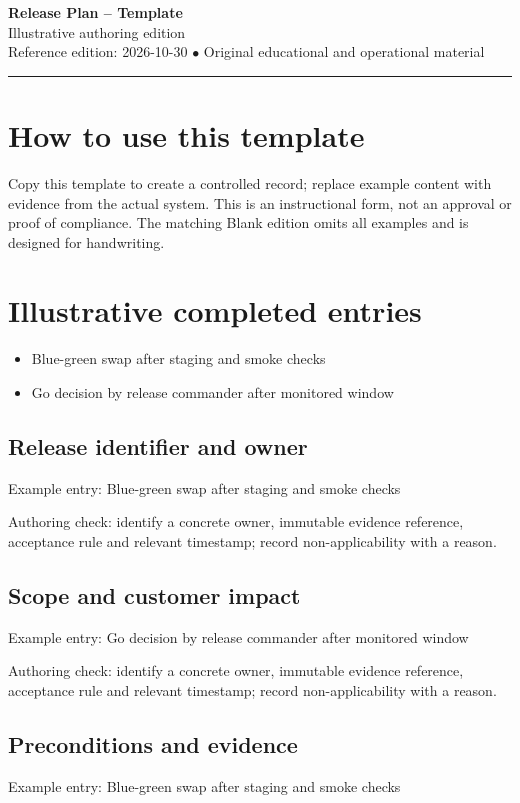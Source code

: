 \documentclass[10pt,letterpaper]{article}
\begin{document}
\begin{center}
{\LARGE\bfseries\color{cdblue}Release Plan -- Template}\\[7pt]
{\large Illustrative authoring edition}\\[6pt]
{\small Reference edition: 2026-10-30 $\bullet$ Original educational and operational material}
\end{center}
\noindent\color{cdblue}\rule{\linewidth}{1.2pt}\color{black}
\vspace{0.4em}
\section{How to use this template}
Copy this template to create a controlled record; replace example content with evidence from the actual system. This is an instructional form, not an approval or proof of compliance. The matching Blank edition omits all examples and is designed for handwriting.


\section{Illustrative completed entries}
\begin{itemize}
\item Blue-green swap after staging and smoke checks
\item Go decision by release commander after monitored window
\end{itemize}

\subsection{Release identifier and owner}
Example entry: Blue-green swap after staging and smoke checks

Authoring check: identify a concrete owner, immutable evidence reference, acceptance rule and relevant timestamp; record non-applicability with a reason.


\subsection{Scope and customer impact}
Example entry: Go decision by release commander after monitored window

Authoring check: identify a concrete owner, immutable evidence reference, acceptance rule and relevant timestamp; record non-applicability with a reason.


\subsection{Preconditions and evidence}
Example entry: Blue-green swap after staging and smoke checks
\end{document}
